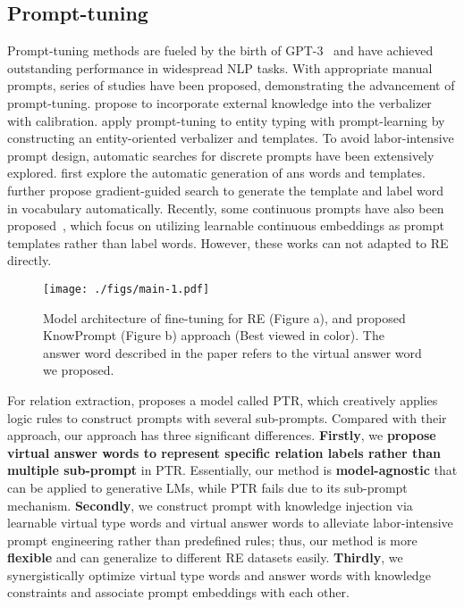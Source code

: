\documentclass[sigconf]{acmart}
\begin{document}
\subsection{Prompt-tuning}
Prompt-tuning methods are fueled by the birth of GPT-3~\cite{DBLP:conf/nips/BrownMRSKDNSSAA20} and have achieved outstanding performance in widespread NLP tasks.
With appropriate manual prompts, series of studies \cite{liu2021pre,ben2021pada,lester2021power,DBLP:journals/corr/abs-2103-08493,reynolds2021prompt,lu2021fantastically} have been proposed, demonstrating the advancement of prompt-tuning. 
\citet{hu2021knowledgeable} propose to incorporate external knowledge into the verbalizer with calibration.  
\citet{ding2021prompt} apply prompt-tuning to entity typing with prompt-learning by constructing an entity-oriented verbalizer and templates. 
To avoid labor-intensive prompt design, automatic searches for discrete prompts have been extensively explored.  
\citet{schick2020automatically,DBLP:journals/corr/abs-2012-15723} first explore the automatic generation of ans words and templates.
\citet{shin2020eliciting} further propose gradient-guided search to generate the template and label word in vocabulary automatically.  
Recently, some continuous prompts have also been proposed~\cite{li2021prefix,warp,liu2021gpt,paras}, which focus on utilizing learnable continuous embeddings as prompt templates rather than label words.
However, these works can not adapted to RE directly.

\begin{figure*}[!htbp] \centering \texttt{[image: ./figs/main-1.pdf]} \caption{Model architecture of fine-tuning for RE (Figure a), and proposed KnowPrompt (Figure b) approach (Best viewed in color). The answer word described in the paper refers to the virtual answer word we proposed.} 
\label{fig:model}
\end{figure*}

For relation extraction, \citet{ptr}  proposes a model called PTR, which creatively applies logic rules to construct prompts with several sub-prompts. 
Compared with their approach, our approach has three significant differences. 
\textbf{Firstly}, we \textbf{propose virtual answer words to represent specific relation labels rather than multiple sub-prompt} in PTR. Essentially, our method is \textbf{model-agnostic} that can be applied to generative LMs, while PTR fails due to its sub-prompt mechanism.
\textbf{Secondly}, we construct prompt with knowledge injection via learnable virtual type words and virtual answer words to alleviate labor-intensive prompt engineering rather than predefined rules; thus, our method is more \textbf{flexible} and can generalize to different RE datasets easily.
\textbf{Thirdly}, we synergistically optimize virtual type words and answer words with knowledge constraints and associate prompt embeddings with each other. 
\end{document}
